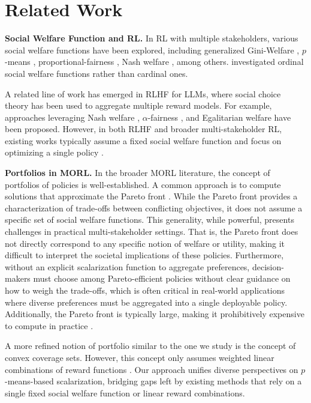 \section{Related Work}
\label{sec:related}

\textbf{Social Welfare Function and RL.}
In RL with multiple stakeholders, various social welfare functions have been explored, including generalized Gini-Welfare \cite{Yu24, cousins2024welfare}, $p$-means \cite{verma2024, fan23, cousins2024welfare}, proportional-fairness \cite{ju2024achieving}, Nash welfare \cite{mandal2023sociallyfairreinforcementlearning}, among others. \cite{alamdari2024policy} investigated ordinal social welfare functions rather than cardinal ones. 

A related line of work has emerged in RLHF for LLMs, where social choice theory has been used to aggregate multiple reward models. For example, approaches leveraging Nash welfare \cite{zhong2024rlhf}, $\alpha$-fairness \cite{park2024rlhf}, and Egalitarian welfare \cite{Chakraborty24} have been proposed. However, in both RLHF and broader multi-stakeholder RL, existing works typically assume a fixed social welfare function and focus on optimizing a single policy \cite{hayes_practical_2022}.

\textbf{Portfolios in MORL.}
In the broader MORL literature, the concept of portfolios of policies is well-established. A common approach is to compute solutions that approximate the Pareto front \cite{parisi14, moff14, radulescu_multi-objective_2019, hayes_practical_2022}. While the Pareto front provides a characterization of trade-offs between conflicting objectives, it does not assume a specific set of social welfare functions. This generality, while powerful, presents challenges in practical multi-stakeholder settings. That is, the Pareto front does not directly correspond to any specific notion of welfare or utility, making it difficult to interpret the societal implications of these policies. Furthermore, without an explicit scalarization function to aggregate preferences, decision-makers must choose among Pareto-efficient policies without clear guidance on how to weigh the trade-offs, which is often critical in real-world applications where diverse preferences must be aggregated into a single deployable policy. Additionally, the Pareto front is typically large, making it prohibitively expensive to compute in practice \cite{hayes_practical_2022}. 

A more refined notion of portfolio similar to the one we study is the concept of convex coverage sets. However, this concept only assumes weighted linear combinations of reward functions \cite{roijers13}. Our approach unifies diverse perspectives on $p$-means-based scalarization, bridging gaps left by existing methods that rely on a single fixed social welfare function or linear reward combinations. 

